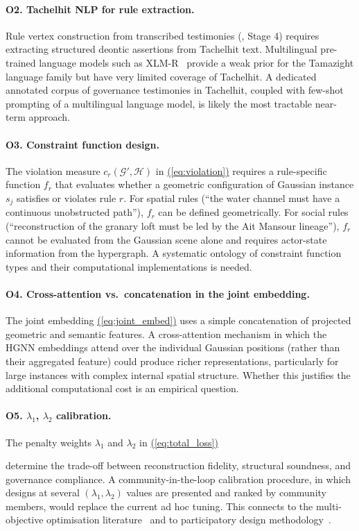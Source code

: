 \documentclass[11pt,a4paper]{article}
\renewcommand{\eqref}[1]{%
    \hyperref[#1]{\textcolor{eqred}{(\ref*{#1})}}%
}
\theoremstyle{plain}
\theoremstyle{definition}
\theoremstyle{remark}
\newcommand{\GS}{\mathcal{G}}
\newcommand{\HG}{\mathcal{H}}
\begin{document}
\paragraph{O2. Tachelhit NLP for rule extraction.}
Rule vertex construction from transcribed testimonies
(, Stage 4) requires extracting structured
deontic assertions from Tachelhit text. Multilingual pre-trained
language models such as XLM-R~\cite{conneau2020unsupervised} provide
a weak prior for the Tamazight language family but have very limited
coverage of Tachelhit. A dedicated annotated corpus of governance
testimonies in Tachelhit, coupled with few-shot prompting of a
multilingual language model, is likely the most tractable near-term
approach.

\paragraph{O3. Constraint function design.}
The violation measure $c_r(\GS', \HG)$ in \eqref{eq:violation} requires
a rule-specific function $f_r$ that evaluates whether a geometric
configuration of Gaussian instance $s_j$ satisfies or violates
rule $r$. For spatial rules (``the water channel must have a continuous
unobstructed path''), $f_r$ can be defined geometrically. For social
rules (``reconstruction of the granary loft must be led by the
Ait Mansour lineage''), $f_r$ cannot be evaluated from the Gaussian
scene alone and requires actor-state information from the hypergraph.
A systematic ontology of constraint function types and their
computational implementations is needed.

\paragraph{O4. Cross-attention vs.\ concatenation in the joint embedding.}
The joint embedding \eqref{eq:joint_embed} uses a simple concatenation
of projected geometric and semantic features. A cross-attention
mechanism in which the HGNN embeddings attend over the individual
Gaussian positions (rather than their aggregated feature) could
produce richer representations, particularly for large instances with
complex internal spatial structure. Whether this justifies the
additional computational cost is an empirical question.

\paragraph{O5. $\lambda_1$, $\lambda_2$ calibration.}
The penalty weights $\lambda_1$ and $\lambda_2$ in \eqref{eq:total_loss}
determine the trade-off between reconstruction fidelity, structural
soundness, and governance compliance. A community-in-the-loop
calibration procedure, in which designs at several $(\lambda_1, \lambda_2)$
values are presented and ranked by community members, would replace
the current ad hoc tuning. This connects to the multi-objective
optimisation literature~\cite{ostrom1990governing} and to participatory
design methodology~\cite{cooke2001participation, sieber2006public}.
\end{document}
